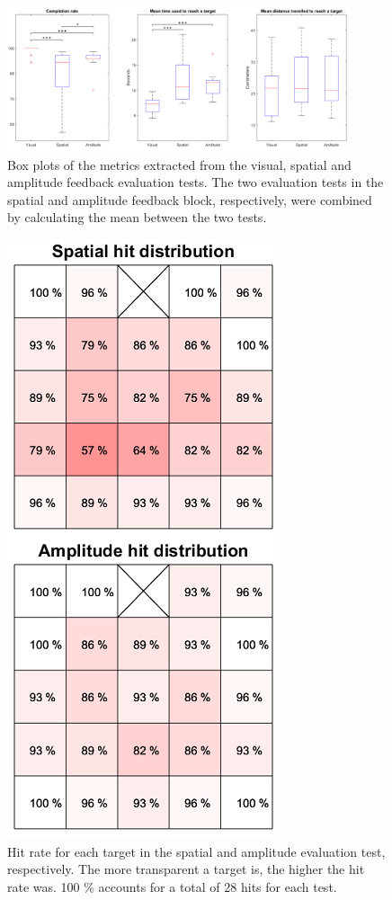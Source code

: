 \begin{figure}[h]                 
	\includegraphics[width=0.9\textwidth]{figures/boxplot_results}
	\caption{Box plots of the metrics extracted from the visual, spatial and amplitude feedback evaluation tests. The two evaluation tests in the spatial and amplitude feedback block, respectively, were combined by calculating the mean between the two tests.}
	\label{fig:pa:boxplot_results} 
\end{figure}

\begin{figure}[H]                 
	\includegraphics[width=.7\textwidth]{figures/hit_dist}
	\caption{Hit rate for each target in the spatial and amplitude evaluation test, respectively. The more transparent a target is, the higher the hit rate was. 100 $\%$ accounts for a total of 28 hits for each test.}
	\label{fig:pa:hit_dist} 
\end{figure}


